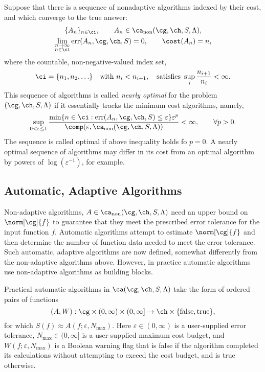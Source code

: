 \documentclass[final]{elsarticle}
\DeclareMathOperator{\err}{err}
\theoremstyle{definition}
\theoremstyle{remark}
\DeclareMathOperator{\fix}{non}
\begin{document}
Suppose that there is a sequence of nonadaptive algorithms indexed by their cost, and which converge to the true answer:
\begin{subequations} \label{algseqdef}
\begin{gather} 
\{A_n\}_{n \in \ci}, \qquad A_n  \in \ca_{\fix}(\cg,\ch,S,\Lambda), \\
\lim_{\substack{n \to \infty\\ n \in \ci}} \err(A_n,\cg,\ch,S) = 0, \qquad \cost(A_n) = n,  
\end{gather}
\end{subequations}
where the countable, non-negative-valued index set, 
\begin{equation} \label{indexdef}
\ci=\{n_1, n_2, \ldots\} \quad \text{with } n_i < n_{i+1}, \quad \text{satisfies } \sup_i \frac{n_{i+1}}{n_i} <\infty. 
\end{equation} 
This sequence of algorithms is called \emph{nearly optimal} for the problem $(\cg,\ch,S,\Lambda)$ if it essentially tracks the minimum cost algorithms, namely,
\begin{equation} \label{nearoptdef}
\sup_{0 < \varepsilon \le 1} \frac{\min\{n \in \ci : \err(A_n,\cg,\ch,S) \le \varepsilon\} \varepsilon^p}{\comp(\varepsilon,\ca_{\fix}(\cg,\ch,S,\Lambda))} <\infty, \qquad \forall p>0.
\end{equation}
The sequence is called optimal if above inequality holds fo $p=0$.  A nearly optimal sequence of algorithms may differ in its cost from an optimal algorithm by powers of $\log(\varepsilon^{-1})$, for example.


\subsection{Automatic, Adaptive Algorithms}

Non-adaptive algorithms, $A \in \ca_{\fix}(\cg,\ch,S,\Lambda)$ need an upper bound on $\norm[\cg]{f}$ to guarantee that they meet the prescribed error tolerance for the input function $f$.  Automatic algorithms attempt to estimate $\norm[\cg]{f}$ and then determine the number of function data needed to meet the error tolerance.  Such automatic, adaptive algorithms are now defined, somewhat differently from the non-adaptive algorithms above.  However, in practice automatic algorithms use non-adaptive algorithms as building blocks.

Practical automatic algorithms in $\ca(\cg,\ch,S,\Lambda)$ take the form of ordered pairs of functions
\[
(A,W): \cg \times (0,\infty)\times (0,\infty] \to \ch \times \{\text{false},\text{true}\},
\]
for which $S(f) \approx A(f;\varepsilon,N_{\max})$.  Here $\varepsilon \in (0,\infty)$ is a user-supplied error tolerance, $N_{\max} \in (0,\infty]$ is a user-supplied maximum cost budget, and $W(f;\varepsilon,N_{\max})$ is a Boolean warning flag that is false if the algorithm completed its calculations without attempting to exceed the cost budget, and is true otherwise.  
\end{document}
